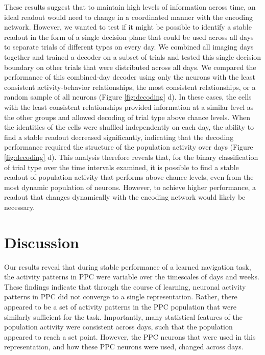 These results suggest that to maintain high levels of information across time, an ideal readout would need to change in a coordinated manner with the encoding network. However, we wanted to test if it might be possible to identify a stable readout in the form of a single decision plane that could be used across all days to separate trials of different types on every day. We combined all imaging days together and trained a decoder on a subset of trials and tested this single decision boundary on other trials that were distributed across all days. We compared the performance of this combined-day decoder using only the neurons with the least consistent activity-behavior relationships, the most consistent relationships, or a random sample of all neurons (Figure \ref{fig:decoding} d). In these cases, the cells with the least consistent relationships provided information at a similar level as the other groups and allowed decoding of trial type above chance levels. When the identities of the cells were shuffled independently on each day, the ability to find a stable readout decreased significantly, indicating that the decoding performance required the structure of the population activity over days (Figure \ref{fig:decoding} d). This analysis therefore reveals that, for the binary classification of trial type over the time intervals examined, it is possible to find a stable readout of population activity that performs above chance levels, even from the most dynamic population of neurons. However, to achieve higher performance, a readout that changes dynamically with the encoding network would likely be necessary. 

\section{Discussion}
Our results reveal that during stable performance of a learned navigation task, the activity patterns in PPC were variable over the timescales of days and weeks. These findings indicate that through the course of learning, neuronal activity patterns in PPC did not converge to a single representation. Rather, there appeared to be a set of activity patterns in the PPC population that were similarly sufficient for the task. Importantly, many statistical features of the population activity were consistent across days, such that the population appeared to reach a set point. However, the PPC neurons that were used in this representation, and how these PPC neurons were used, changed across days.

